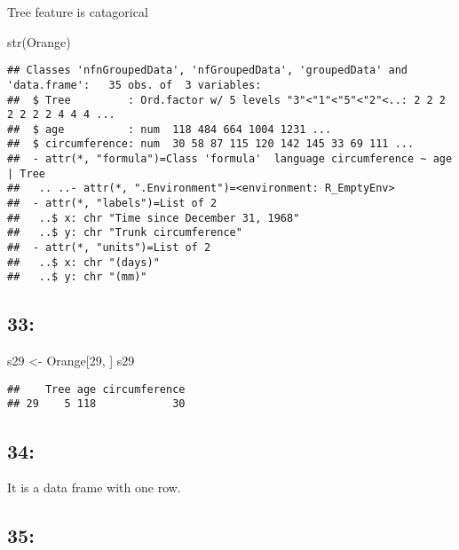 \documentclass[
]{article}
\newenvironment{Shaded}{\begin{snugshade}}{\end{snugshade}}
\newcommand{\DecValTok}[1]{\textcolor[rgb]{0.00,0.00,0.81}{#1}}
\newcommand{\FunctionTok}[1]{\textcolor[rgb]{0.00,0.00,0.00}{#1}}
\newcommand{\NormalTok}[1]{#1}
\newcommand{\OtherTok}[1]{\textcolor[rgb]{0.56,0.35,0.01}{#1}}
\begin{document}
Tree feature is catagorical

\begin{Shaded}
\begin{Highlighting}[]
\FunctionTok{str}\NormalTok{(Orange)}
\end{Highlighting}
\end{Shaded}

\begin{verbatim}
## Classes 'nfnGroupedData', 'nfGroupedData', 'groupedData' and 'data.frame':   35 obs. of  3 variables:
##  $ Tree         : Ord.factor w/ 5 levels "3"<"1"<"5"<"2"<..: 2 2 2 2 2 2 2 4 4 4 ...
##  $ age          : num  118 484 664 1004 1231 ...
##  $ circumference: num  30 58 87 115 120 142 145 33 69 111 ...
##  - attr(*, "formula")=Class 'formula'  language circumference ~ age | Tree
##   .. ..- attr(*, ".Environment")=<environment: R_EmptyEnv> 
##  - attr(*, "labels")=List of 2
##   ..$ x: chr "Time since December 31, 1968"
##   ..$ y: chr "Trunk circumference"
##  - attr(*, "units")=List of 2
##   ..$ x: chr "(days)"
##   ..$ y: chr "(mm)"
\end{verbatim}

\hypertarget{section-32}{%
\subsection{33:}\label{section-32}}

\begin{Shaded}
\begin{Highlighting}[]
\NormalTok{s29 }\OtherTok{\textless{}{-}}\NormalTok{ Orange[}\DecValTok{29}\NormalTok{, ]}
\NormalTok{s29}
\end{Highlighting}
\end{Shaded}

\begin{verbatim}
##    Tree age circumference
## 29    5 118            30
\end{verbatim}

\hypertarget{section-33}{%
\subsection{34:}\label{section-33}}

It is a data frame with one row.

\hypertarget{section-34}{%
\subsection{35:}\label{section-34}}
\end{document}
